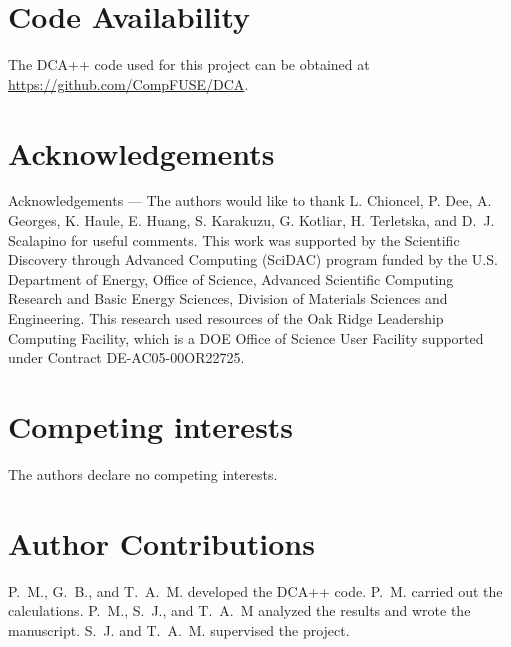 \documentclass[fleqn,twocolumn,11pt]{wlscirep}
\begin{document}
\section*{Code Availability} The DCA++ code used for this project can be obtained at \url{https://github.com/CompFUSE/DCA}.

\section*{Acknowledgements}
Acknowledgements --- The authors would like to thank L. Chioncel, P. Dee, A. Georges, K. Haule, E. Huang, S. Karakuzu, G. Kotliar, H. Terletska, and D.~J. Scalapino for useful comments. This work was supported by the Scientific Discovery through Advanced Computing (SciDAC) program funded by the U.S. Department of Energy, Office of Science, Advanced Scientific Computing Research and Basic Energy Sciences, Division of Materials Sciences and Engineering. This research  used resources of the Oak Ridge Leadership Computing Facility, which is a DOE Office of Science User Facility supported under Contract DE-AC05-00OR22725. 

\section*{Competing interests}
The authors declare no competing interests. 


\section*{Author Contributions}
P.~M., G.~B., and T.~A.~M. developed the DCA++ code. P.~M. carried out the calculations. P.~M., S.~J., and T.~A.~M analyzed the results and wrote the manuscript. S.~J. and T.~A.~M. supervised the project.
\end{document}
